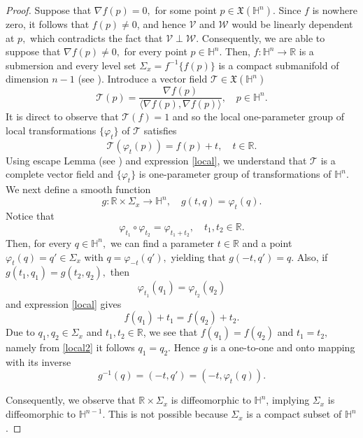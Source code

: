 \documentclass[12pt]{amsart}
\def\r{\mathbb R}
\def\h{\mathbb H}
\theoremstyle{definition}
\begin{document}
\begin{proof}
Suppose that $\nabla f(p)=0,$ for some point $p\in \mathfrak{X}(\h^n).$ Since $f$ is nowhere zero, it follows that $f(p)\neq 0$, and hence $\mathcal{V}$ and $\mathcal{W}$ would be linearly dependent at $p,$ which contradicts the fact that $\mathcal{V} \perp \mathcal{W}$. Consequently, we are able to suppose that $\nabla f(p)\neq 0,$ for every point $p\in \h^n.$ Then, $f:\h^n\to \r$ is a submersion and every level set $\Sigma_x=f^{-1}\{ f(p)\} $ is
a compact submanifold of dimension $n-1$ (see \cite{lee}). Introduce a vector field $\mathcal{T}\in \mathfrak{X}(\h^n)$
\begin{equation*}
\mathcal{T}(p)=\frac{\nabla f(p)}{\langle \nabla f(p),\nabla f(p)\rangle }, \quad p\in \h^n.   
\end{equation*}
It is direct to observe that $\mathcal{T}(f)=1$ and so the local
one-parameter group of local transformations $\{ \varphi _{t}\}$ of $\mathcal{T}$ satisfies%
\begin{equation} \label{local}
\mathcal{T}( \varphi_{t}(p)) =f(p)+t, \quad t \in \r.
\end{equation}%
Using escape Lemma (see \cite{lee}) and expression \eqref{local}, we understand
that $\mathcal{T}$ is a complete vector field and $\{ \varphi_{t}\} $ is one-parameter group of transformations of $\h^n.$ We next define a smooth function 
\begin{equation*}
g:\r \times \Sigma _{x}\to \h^n, \quad g(t,q)=\varphi _{t}(q).    
\end{equation*}
Notice that 
\begin{equation*}
\varphi _{t_{1}}\circ \varphi _{t_{2}}=\varphi _{t_1+t_2}, \quad t_1,t_2\in \r.    
\end{equation*}
Then, for every $q\in \h^n,$ we can find a parameter $t\in \r$ and a point $\varphi_t(q)=q'\in \Sigma_x$ with $q=\varphi_{-t}(q'),$ yielding that $%
g(-t,q')=q.$ Also, if $g(t_1,q_1)=g(t_2,q_2),$ then 
\begin{equation} \label{local2}
\varphi _{t_1}(q_1)=\varphi _{t_2}(q_2) 
\end{equation}
and expression \eqref{local} gives 
\begin{equation*}
f(q_1)+t_1=f(q_2)+t_2.    
\end{equation*}
Due to $q_1,q_2\in \Sigma_x$ and $t_1,t_2\in \r$, we see
that $f(q_1)=f(q_2)$ and $t_1=t_2,$ namely from \eqref{local2} it follows $q_1=q_2.$ Hence $g$ is a one-to-one and onto mapping with its inverse%
\begin{equation*}
g^{-1}(q)=(-t,q')=(-t,\varphi_t(q)).   \end{equation*}

Consequently, we observe that $\r\times \Sigma_x$ is
diffeomorphic to $\h^n$, implying $\Sigma_x$ is diffeomorphic
to $\h^{n-1}$. This is not possible because $\Sigma_x$ is a compact subset of $\h^n$. 
\end{proof}
\end{document}

